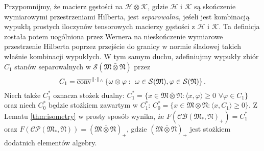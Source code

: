 Przypomnijmy, że macierz gęstości na $\mathcal{H}\otimes\mathcal{K}$,
gdzie $\mathcal{H}$ i $\mathcal{K}$
są skończenie wymiarowymi przestrzeniami Hilberta,
jest \emph{separowalna},
jeśeli jest kombinacją wypukłą prostych iloczynów tensorowych macierzy gęstości
z $\mathcal{H}$ i $\mathcal{K}$.
Ta definicja została potem uogólniona przez Wernera \cite{werner1989quantum}
na nieskończenie wymiarowe przestrzenie Hilberta poprzez
przejście do granicy w normie śladowej takich właśnie kombinacji wypukłych.
W tym samym duchu, zdefiniujmy wypukły zbiór $C_1$
stanów separowalnych w
$\mathcal{S}(\mathfrak{M} \bar{\otimes} \mathfrak{N})$ przez
\begin{equation}
C_{1} = \overline{{\rm conv}}^{||\cdot||_{\wedge}}
\left \{\omega \otimes \varphi: \, \,\omega \in \mathcal{S}(\mathfrak{M}),
\varphi \in \mathcal{S}(\mathfrak{N})\right \}.
\end{equation}
Niech także $C_{1}^{*}$ oznacza stożek dualny:
$C_{1}^{*} = \{ x \in \mathfrak{M} \bar{\otimes} \mathfrak{N}:
 \langle x , \varphi \rangle \geq 0 \,\, \forall \varphi \in C_{1} \}$ oraz
niech $C_{0}^{*}$ będzie stożkiem zawartym w
$C_{1}^{*}$:
$C_{0}^{*} = \{ x \in \mathfrak{M} \otimes \mathfrak{N}:\langle x , C_{1} \rangle \geq 0 \}$.
Z Lematu \ref{thm:isometry} w prosty sposób wynika, że
$F(\mathcal{CB}(\mathfrak{M}_{*}, \mathfrak{N})_{+}) = C_{1}^{*}$ oraz
$F(\mathcal{CP}(\mathfrak{M}_{*}, \mathfrak{N})) = (\mathfrak{M} \bar{\otimes} \mathfrak{N})_{+}$,
gdzie $(\mathfrak{M} \bar{\otimes} \mathfrak{N})_{+}$
jest stożkiem dodatnich elementów algebry.

